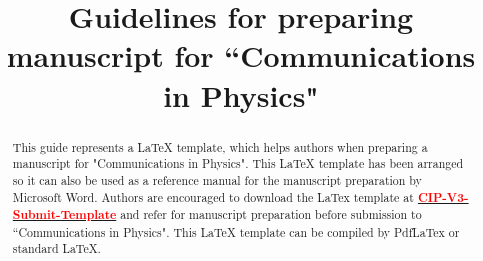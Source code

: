 \documentclass[a4,11pt]{cip-v3-cls-submit}
\begin{document}
	\title{Guidelines for preparing manuscript for ``Communications in Physics"}
\maketitle


\begin{abstract}
This guide represents a LaTeX template, which helps authors when preparing a manuscript for  "Communications in Physics". This LaTeX template has been arranged so it can also be used as a reference manual for the manuscript preparation by Microsoft Word. Authors are encouraged to download the LaTex template at \href{https://vjs.ac.vn/index.php/cip/libraryFiles/downloadPublic/16}{\textbf{\textcolor{red}{CIP-V3-Submit-Template}}} and refer for manuscript preparation before submission to ``Communications in Physics". This LaTeX template can be compiled by PdfLaTex or standard LaTeX. 
\end{abstract}

\end{document}
